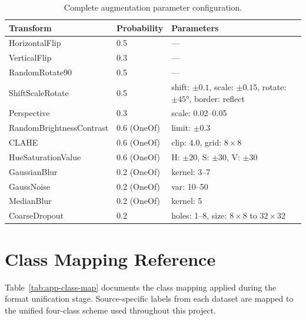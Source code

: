 \documentclass[a4paper,12pt,twoside]{report}
\begin{document}
\begin{table}[htbp]
  \centering
  \caption{Complete augmentation parameter configuration.}
  \label{tab:app-aug-params}
  \small
  \begin{tabularx}{\textwidth}{llX}
    \toprule
    \textbf{Transform} & \textbf{Probability} & \textbf{Parameters} \\
    \midrule
    HorizontalFlip       & 0.5 & --- \\
    VerticalFlip         & 0.3 & --- \\
    RandomRotate90       & 0.5 & --- \\
    ShiftScaleRotate     & 0.5 & shift: $\pm 0.1$, scale: $\pm 0.15$,
                                  rotate: $\pm 45°$, border: reflect \\
    Perspective          & 0.3 & scale: 0.02--0.05 \\
    RandomBrightnessContrast & 0.6 (OneOf) & limit: $\pm 0.3$ \\
    CLAHE                & 0.6 (OneOf) & clip: 4.0, grid: $8 \times 8$ \\
    HueSaturationValue   & 0.6 (OneOf) & H: $\pm 20$, S: $\pm 30$,
                                          V: $\pm 30$ \\
    GaussianBlur         & 0.2 (OneOf) & kernel: 3--7 \\
    GaussNoise           & 0.2 (OneOf) & var: 10--50 \\
    MedianBlur           & 0.2 (OneOf) & kernel: 5 \\
    CoarseDropout        & 0.2 & holes: 1--8, size: $8 \times 8$ to
                                  $32 \times 32$ \\
    \bottomrule
  \end{tabularx}
\end{table}

\chapter{Class Mapping Reference}
\label{app:class-mapping}

Table~\ref{tab:app-class-map} documents the class mapping applied during the
format unification stage. Source-specific labels from each dataset are mapped to
the unified four-class scheme used throughout this project.
\end{document}

